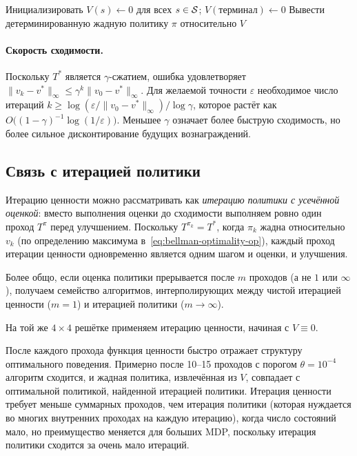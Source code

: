 \begin{algorithm}[ht]
\caption{Итерация ценности}
\label{alg:value-iteration}
Инициализировать $V(s) \leftarrow 0$ для всех $s \in \mathcal{S}$; $V(\mbox{терминал}) \leftarrow 0$\;
Вывести детерминированную жадную политику $\pi$ относительно $V$\;
\end{algorithm}

\paragraph{Скорость сходимости.}
Поскольку $T^*$ является $\gamma$-сжатием, ошибка удовлетворяет $\|v_k - v^*\|_\infty \le \gamma^k \|v_0 - v^*\|_\infty$.  Для желаемой точности $\varepsilon$ необходимое число итераций $k \ge \log(\varepsilon / \|v_0 - v^*\|_\infty) / \log \gamma$, которое растёт как $O\!\bigl((1-\gamma)^{-1}\log(1/\varepsilon)\bigr)$.  Меньшее $\gamma$ означает более быструю сходимость, но более сильное дисконтирование будущих вознаграждений.

\subsection*{Связь с итерацией политики}

Итерацию ценности можно рассматривать как \emph{итерацию политики с усечённой оценкой}: вместо выполнения оценки до сходимости выполняем ровно один проход $T^\pi$ перед улучшением.  Поскольку $T^{\pi_k} = T^*$, когда $\pi_k$ жадна относительно $v_k$ (по определению максимума в~\eqref{eq:bellman-optimality-op}), каждый проход итерации ценности одновременно является одним шагом и оценки, и улучшения.

Более общо, если оценка политики прерывается после $m$ проходов (а не $1$ или $\infty$), получаем семейство алгоритмов, интерполирующих между чистой итерацией ценности ($m=1$) и итерацией политики ($m \to \infty$).

\begin{example}
\label{ex:vi-gridworld}
На той же $4\times4$ решётке применяем итерацию ценности, начиная с $V \equiv 0$.

После каждого прохода функция ценности быстро отражает структуру оптимального поведения.  Примерно после 10--15 проходов с порогом $\theta = 10^{-4}$ алгоритм сходится, и жадная политика, извлечённая из $V$, совпадает с оптимальной политикой, найденной итерацией политики.  Итерация ценности требует меньше суммарных проходов, чем итерация политики (которая нуждается во многих внутренних проходах на каждую итерацию), когда число состояний мало, но преимущество меняется для больших MDP, поскольку итерация политики сходится за очень мало итераций.
\end{example}

